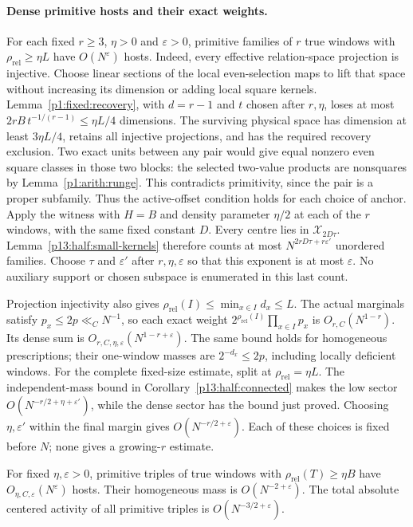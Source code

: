 \paragraph{Dense primitive hosts and their exact weights.}
\label{p18:conf:fixed-primitive}
For each fixed $r\ge3$, $\eta>0$ and $\varepsilon>0$, primitive
families of $r$ true windows with
$\rho_{\mathrm{rel}}\ge\eta L$ have $O(N^\varepsilon)$ hosts.
Indeed, every effective relation-space projection is injective. Choose
linear sections of the local even-selection maps to lift that space
without increasing its dimension or adding local square kernels.
Lemma~\ref{p1:fixed:recovery}, with $d=r-1$ and $t$ chosen after
$r,\eta$, loses at most $2rB\,t^{-1/(r-1)}\le\eta L/4$ dimensions.
The surviving physical space has dimension at least $3\eta L/4$,
retains all injective projections, and has the required recovery
exclusion. Two exact
units between any pair would give equal nonzero even square classes
in those two blocks: the selected two-value products are nonsquares
by Lemma~\ref{p1:arith:runge}. This contradicts primitivity, since
the pair is a proper subfamily. Thus the active-offset condition
holds for each choice of anchor. Apply the witness with $H=B$ and
density parameter $\eta/2$ at each of the $r$ windows, with the same
fixed constant $D$.
Every centre lies in $\mathcal X_{2D\tau}$.
Lemma~\ref{p13:half:small-kernels} therefore counts at most
$N^{2rD\tau+r\varepsilon'}$ unordered families. Choose $\tau$ and
$\varepsilon'$ after $r,\eta,\varepsilon$ so that this exponent is
at most $\varepsilon$. No auxiliary support or chosen subspace is
enumerated in this last count.

Projection injectivity also gives
$\rho_{\mathrm{rel}}(I)\le\min_{x\in I}d_x\le L$.
The actual marginals satisfy $p_x\le2p\ll_C N^{-1}$, so each exact
weight $2^{\rho_{\mathrm{rel}}(I)}\prod_{x\in I}p_x$ is
$O_{r,C}(N^{1-r})$. Its dense sum is
$O_{r,C,\eta,\varepsilon}(N^{1-r+\varepsilon})$.
The same bound holds for homogeneous prescriptions; their one-window
masses are $2^{-d_x}\le2p$, including locally deficient windows.
For the complete fixed-size estimate, split at
$\rho_{\mathrm{rel}}=\eta L$. The independent-mass bound in
Corollary~\ref{p13:half:connected} makes the low sector
$O(N^{-r/2+\eta+\varepsilon'})$, while the dense sector has the bound
just proved. Choosing $\eta,\varepsilon'$ within the final margin
gives $O(N^{-r/2+\varepsilon})$. Each of these choices is fixed
before $N$; none gives a growing-$r$ estimate.

\begin{theorem}
\label{p13:conf:dense-primitive}
For fixed \(\eta,\varepsilon>0\), primitive triples of
true windows with \(\rho_{\mathrm{rel}}(T)\ge\eta B\)
have \(O_{\eta,C,\varepsilon}(N^\varepsilon)\) hosts.
Their homogeneous mass is \(O(N^{-2+\varepsilon})\).
The total absolute centered activity of all primitive
triples is \(O(N^{-3/2+\varepsilon})\).
\end{theorem}

